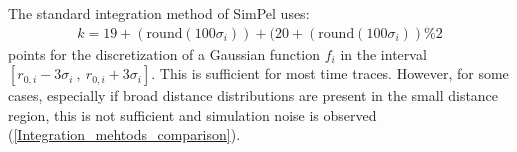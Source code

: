 \documentclass[pdftex,bezier,german,a4,twoside, headexclude,12pt,nochapterprefix, titlepage]{extarticle}
\newcommand{\simpel}{\textsf{SimPel}}
\newcommand{\figspace}{\hspace{0.5cm}}
\begin{document}
The standard integration method of \simpel{} uses:
%
\begin{align*}
k =  19+(\mathrm{round}(100\sigma_i)) + (20+(\mathrm{round}(100\sigma_i))\%2
\end{align*}
%
points for the discretization of a Gaussian function $f_i$ in the interval $[r_{0,i}-3\sigma_i \ ,\ r_{0,i}+3\sigma_i]$. This is sufficient for most time traces. However, for some cases, especially if broad distance distributions are present in the small distance region, this is not sufficient and simulation noise is observed (\autoref{Integration_mehtods_comparison}).

\begin{figure}[!htb]
\centering
     \figspace
      \\[-0.3cm]

\end{figure}
\end{document}
